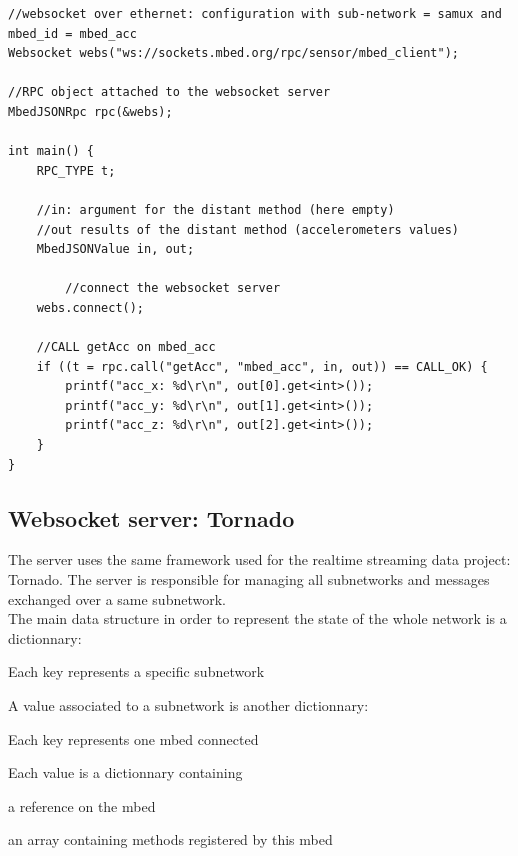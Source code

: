 \documentclass[pdftex,10pt,a4paper]{report}
\newenvironment{packed_item}{
\begin{itemize}
  \setlength{\itemsep}{1pt}
  \setlength{\parskip}{0pt}
  \setlength{\parsep}{0pt}
}{\end{itemize}}
\begin{document}
\begin{lstlisting}[label=Client which calls a distant method,caption=Client which calls a distant method]
//websocket over ethernet: configuration with sub-network = samux and mbed_id = mbed_acc
Websocket webs("ws://sockets.mbed.org/rpc/sensor/mbed_client");

//RPC object attached to the websocket server
MbedJSONRpc rpc(&webs);

int main() {
    RPC_TYPE t;
    
    //in: argument for the distant method (here empty)
    //out results of the distant method (accelerometers values)
    MbedJSONValue in, out;

		//connect the websocket server
    webs.connect();

    //CALL getAcc on mbed_acc
    if ((t = rpc.call("getAcc", "mbed_acc", in, out)) == CALL_OK) {
        printf("acc_x: %d\r\n", out[0].get<int>());
        printf("acc_y: %d\r\n", out[1].get<int>());
        printf("acc_z: %d\r\n", out[2].get<int>());
    }
}
\end{lstlisting}

\subsection{Websocket server: Tornado}
The server uses the same framework used for the realtime streaming data project: Tornado. The server is responsible for managing all subnetworks and messages exchanged over a same subnetwork. \\


The main data structure in order to represent the state of the whole network is a dictionnary:
\begin{packed_item}
	\item Each key represents a specific subnetwork
	\item A value associated to a subnetwork is another dictionnary:
		\begin{packed_item}
			\item Each key represents one mbed connected
			\item Each value is a dictionnary containing
			\begin{packed_item}
				\item a reference on the mbed
				\item an array containing methods registered by this mbed
			\end{packed_item}
		\end{packed_item}
\end{packed_item}
\end{document}
